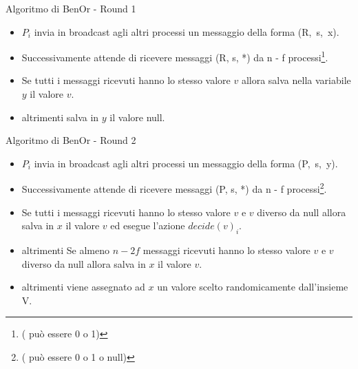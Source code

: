 \documentclass{beamer}
\begin{document}
\begin{frame}{Algoritmo di BenOr - Round 1}
    \begin{itemize}
        \item $P_{i}$ invia in broadcast agli altri processi un messaggio della forma \mbox{(R, s, x)}.

        \item Successivamente attende di ricevere messaggi (R, s, *) da n - f processi\footnote{( può essere 0 o 1)}.

        \item Se tutti i messaggi ricevuti hanno lo stesso valore $v$ allora salva nella variabile $y$ il valore $v$.

        \item altrimenti salva in $y$ il valore null.

    \end{itemize}
\end{frame}


\begin{frame}{Algoritmo di BenOr - Round 2}

    \begin{itemize}
        \item $P_{i}$ invia in broadcast agli altri processi un messaggio della forma \mbox{(P, s, y)}.

        \item Successivamente attende di ricevere messaggi (P, s, *) da n - f processi\footnote{( può essere 0 o 1 o null)}.

        \item Se tutti i messaggi ricevuti hanno lo stesso valore $v$ e $v$ diverso da null allora salva in $x$ il valore $v$ ed esegue l'azione $decide(v)_{i}$.

        \item altrimenti Se almeno $n - 2f$ messaggi ricevuti hanno lo stesso valore $v$ e $v$ diverso da null allora salva in $x$ il valore $v$.

        \item altrimenti viene assegnato ad $x$ un valore scelto randomicamente dall'insieme V.
    \end{itemize}
\end{frame}


\end{document}
